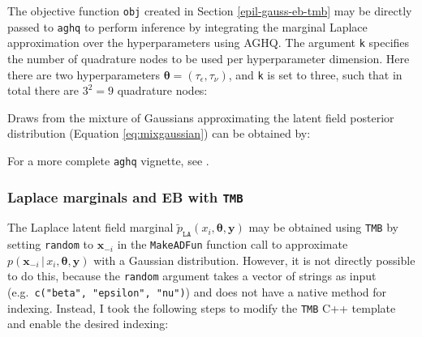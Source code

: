 \documentclass[a4paper, nobind]{templates/ociamthesis}
\newenvironment{Shaded}{\begin{snugshade}}{\end{snugshade}}
\newcommand{\AttributeTok}[1]{\textcolor[rgb]{0.13,0.29,0.53}{#1}}
\newcommand{\DecValTok}[1]{\textcolor[rgb]{0.00,0.00,0.81}{#1}}
\newcommand{\FunctionTok}[1]{\textcolor[rgb]{0.13,0.29,0.53}{\textbf{#1}}}
\newcommand{\NormalTok}[1]{#1}
\newcommand{\OtherTok}[1]{\textcolor[rgb]{0.56,0.35,0.01}{#1}}
\newcommand{\SpecialCharTok}[1]{\textcolor[rgb]{0.81,0.36,0.00}{\textbf{#1}}}
\renewenvironment{Shaded}
{
  \vspace{10pt}%
  \begin{snugshade}%
}{%
  \end{snugshade}%
  \vspace{8pt}%
}
\begin{document}
The objective function \texttt{obj} created in Section \ref{epil-gauss-eb-tmb} may be directly passed to \texttt{aghq} to perform inference by integrating the marginal Laplace approximation over the hyperparameters using AGHQ.
The argument \texttt{k} specifies the number of quadrature nodes to be used per hyperparameter dimension.
Here there are two hyperparameters \(\boldsymbol{\mathbf{\theta}} = (\tau_\epsilon, \tau_\nu)\), and \texttt{k} is set to three, such that in total there are \(3^2 = 9\) quadrature nodes:

\begin{Shaded}
\end{Shaded}

Draws from the mixture of Gaussians approximating the latent field posterior distribution (Equation \eqref{eq:mixgaussian}) can be obtained by:

\begin{Shaded}
\end{Shaded}

For a more complete \texttt{aghq} vignette, see \textcite{stringer2021implementing}.

\hypertarget{epil-laplace-eb-tmb}{%
\subsubsection{\texorpdfstring{Laplace marginals and EB with \texttt{TMB}}{Laplace marginals and EB with TMB}}\label{epil-laplace-eb-tmb}}

The Laplace latent field marginal \(\tilde p_\texttt{LA}(x_i, \boldsymbol{\mathbf{\theta}}, \mathbf{y})\) may be obtained using \texttt{TMB} by setting \texttt{random} to \(\mathbf{x}_{-i}\) in the \texttt{MakeADFun} function call to approximate \(p(\mathbf{x}_{-i} \, | \,x_i, \boldsymbol{\mathbf{\theta}}, \mathbf{y})\) with a Gaussian distribution.
However, it is not directly possible to do this, because the \texttt{random} argument takes a vector of strings as input (e.g.~\texttt{c("beta",\ "epsilon",\ "nu")}) and does not have a native method for indexing.
Instead, I took the following steps to modify the \texttt{TMB} C++ template and enable the desired indexing:
\end{document}
